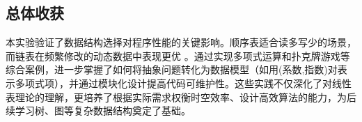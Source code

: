 \documentclass{article}
\begin{document}
\subsection{总体收获}
本实验验证了数据结构选择对程序性能的关键影响。顺序表适合读多写少的场景，而链表在频繁修改的动态数据中表现更优
。通过实现多项式运算和扑克牌游戏等综合案例，进一步掌握了如何将抽象问题转化为数据模型（如用(系数,指数)对表示多项式项），并通过模块化设计提高代码可维护性。这些实践不仅深化了对线性表理论的理解，更培养了根据实际需求权衡时空效率、设计高效算法的能力，为后续学习树、图等复杂数据结构奠定了基础。
\end{document}
